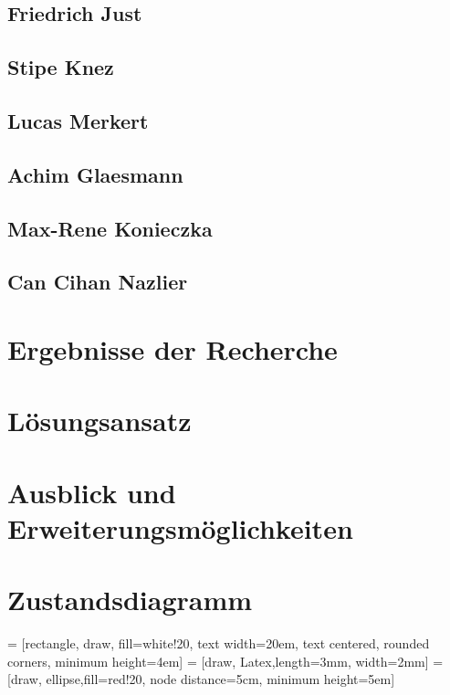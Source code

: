 \documentclass[]{article}
\begin{document}
		\subsection{Friedrich Just}
		\subsection{Stipe Knez}
		\subsection{Lucas Merkert}
		\subsection{Achim Glaesmann}
		\subsection{Max-Rene Konieczka}
		\subsection{Can Cihan Nazlier}
		
	\section{Ergebnisse der Recherche}%
	\section{Lösungsansatz} %
		
	\section{Ausblick und Erweiterungsmöglichkeiten}
		
		
	\section{Zustandsdiagramm}
	 = [rectangle, draw, fill=white!20, text width=20em, text centered, rounded corners, minimum height=4em]
	 = [draw, Latex,length=3mm, width=2mm]
	 = [draw, ellipse,fill=red!20, node distance=5cm, minimum height=5em]
	
\end{document}
